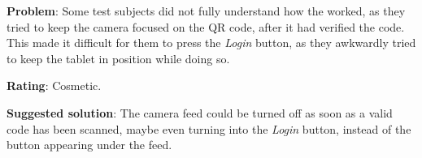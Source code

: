 \begin{description}
\item{\textbf{Problem}:} Some test subjects did not fully understand how the \authenticationactivity worked, as they tried to keep the camera focused on the QR code, after it had verified the code. 
This made it difficult for them to press the \textit{Login} button, as they awkwardly tried to keep the tablet in position while doing so. 
\item{\textbf{Rating}:} Cosmetic.
\item{\textbf{Suggested solution}:} The camera feed could be turned off as soon as a valid code has been scanned, maybe even turning into the \textit{Login} button, instead of the button appearing under the feed. 
\end{description}